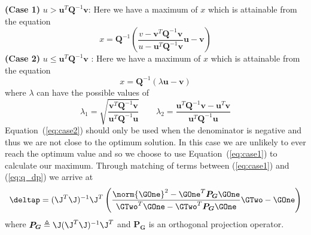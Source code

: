 \textbf{(Case 1)} $u > \boldsymbol{u}^T \boldsymbol{Q}^{-1} \boldsymbol{v}$: Here we have a maximum of $x$ which is attainable from the equation
\begin{equation}\label{eq:case1}
    x = \boldsymbol{Q}^{-1} \left( \frac{v - \boldsymbol{v}^T  \boldsymbol{Q}^{-1} \boldsymbol{v}}{u - \boldsymbol{u}^T \boldsymbol{Q}^{-1} \boldsymbol{v}} \boldsymbol{u} - \boldsymbol{v} \right)
\end{equation}
\textbf{(Case 2)} $u \le \boldsymbol{u}^T \boldsymbol{Q}^{-1} \boldsymbol{v}$ : Here we have a maximum of $x$ which is attainable from the equation
\begin{equation}\label{eq:case2}
    x = \boldsymbol{Q}^{-1} \left( \lambda \boldsymbol{u} - \boldsymbol{v} \right)
\end{equation}
where $\lambda$ can have the possible values of
\begin{equation}\label{eq:lambda}
    \lambda_1 = \sqrt{\frac{\boldsymbol{v}^T \boldsymbol{Q}^{-1} \boldsymbol{v}}{\boldsymbol{u}^T \boldsymbol{Q}^{-1} \boldsymbol{u}}} \qquad \lambda_2 = \frac{\boldsymbol{u}^T \boldsymbol{Q}^{-1} \boldsymbol{v} - \boldsymbol{u}^T \boldsymbol{v}}{\boldsymbol{u}^T \boldsymbol{Q}^{-1} \boldsymbol{u}}
\end{equation}
Equation~(\ref{eq:case2}) should only be used when the denominator is negative and thus we are not close to the optimum solution. In this case we are unlikely to ever reach the optimum value and so we choose to use Equation~(\ref{eq:case1}) to calculate our maximum. Through matching of terms between (\ref{eq:case1}) and (\ref{eq:q_dp}) we arrive at
\begin{equation}\label{eq:max_deltap}
    \deltap = (\J^T \J)^{-1} \J^T \left( \frac{\norm{\GOne}^2 - \GOne^T \boldsymbol{P_G} \GOne}{\GTwo^T \GOne - \GTwo^T \boldsymbol{P_G} \GOne} \GTwo - \GOne \right)
\end{equation}
where $\boldsymbol{P_G} \triangleq \J (\J^T \J)^{-1} \J^T$ and $\boldsymbol{P_G}$ is an orthogonal projection operator.